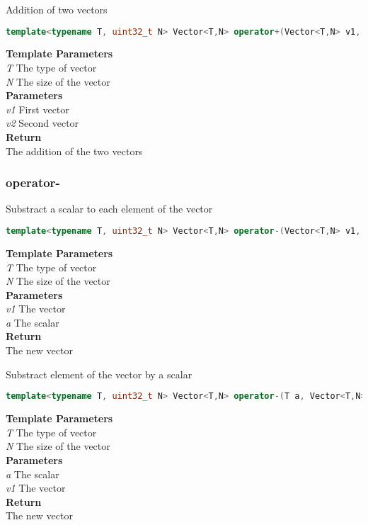 \begin{mdframed}
Addition of two vectors
\begin{lstlisting}[language=C++]
template<typename T, uint32_t N> Vector<T,N> operator+(Vector<T,N> v1, const Vector<T,N>& v2) 
\end{lstlisting}
\textbf{Template Parameters} \\ 
\textit{T} The type of vector \\ 
\textit{N} The size of the vector \\ 
\textbf{Parameters} \\ 
\textit{v1} First vector \\ 
\textit{v2} Second vector \\ 
\textbf{Return} \\ 
The addition of the two vectors\\ 
\end{mdframed}

\subsubsection{operator-}
\begin{mdframed}
Substract a scalar to each element of the vector
\begin{lstlisting}[language=C++]
template<typename T, uint32_t N> Vector<T,N> operator-(Vector<T,N> v1, T a) 
\end{lstlisting}
\textbf{Template Parameters} \\ 
\textit{T} The type of vector \\ 
\textit{N} The size of the vector \\ 
\textbf{Parameters} \\ 
\textit{v1} The vector \\ 
\textit{a} The scalar \\ 
\textbf{Return} \\ 
The new vector\\ 
\end{mdframed}

\begin{mdframed}
Substract element of the vector by a scalar
\begin{lstlisting}[language=C++]
template<typename T, uint32_t N> Vector<T,N> operator-(T a, Vector<T,N> v1) 
\end{lstlisting}
\textbf{Template Parameters} \\ 
\textit{T} The type of vector \\ 
\textit{N} The size of the vector \\ 
\textbf{Parameters} \\ 
\textit{a} The scalar \\ 
\textit{v1} The vector \\ 
\textbf{Return} \\ 
The new vector\\ 
\end{mdframed}

